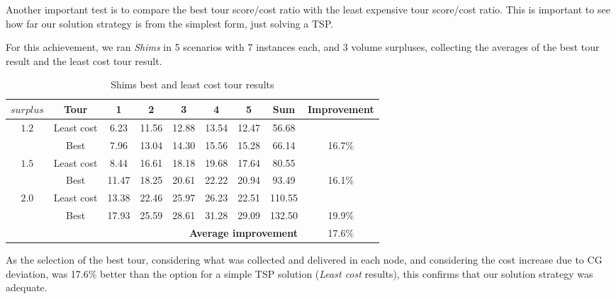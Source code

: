 \documentclass[preprint]{elsarticle}
\begin{document}
{Another important test is to compare the best tour score/cost ratio with the least expensive tour score/cost ratio. This is important to see how far our solution strategy is from the simplest form, just solving a TSP.

For this achievement, we ran {\it Shims} in 5 scenarios with 7 instances each, and 3 volume surpluses, collecting the averages of the best tour result and the least cost tour result.

\begin{table}[H]
\centering
\caption{Shims best and least cost tour results}  \label{tab:20least}
\footnotesize
\begin{tabular}{c|c|ccccc|cc}
\toprule
{$surplus$}              & {\bf Tour} & {\bf 1} & {\bf 2} & {\bf 3} & {\bf 4}  & {\bf 5}   & {\bf Sum} & {\bf Improvement}\\

\midrule[.1pt]	
\multirow{2}{*}{$1.2$}   & Least cost    & 6.23  & 11.56   & 12.88   & 13.54    & 12.47  & 56.68 &       \\ 
& Best                                   & 7.96  & 13.04   & 14.30   & 15.56    & 15.28  & 66.14 & 16.7\%  \\ 
\midrule[.1pt]	
\multirow{2}{*}{$1.5$}   & Least cost    & 8.44  & 16.61   & 18.18   & 19.68    & 17.64  & 80.55 &   \\ %
& Best                                   & 11.47 & 18.25   & 20.61   & 22.22    & 20.94  & 93.49 & 16.1\%  \\ 
\midrule[.1pt]	
\multirow{2}{*}{$2.0$}   & Least cost    & 13.38 & 22.46   & 25.97   & 26.23    & 22.51  & 110.55 &   \\ %
& Best                                   & 17.93 & 25.59   & 28.61   & 31.28    & 29.09  & 132.50 & 19.9\%  \\ 		                         

\midrule[.1pt]
 \multicolumn{8}{r}{{\bf Average improvement}} & 17.6\% \\
\bottomrule
\end{tabular}
\normalsize
\end{table}

As the selection of the best tour, considering what was collected and delivered in each node, and considering the cost increase due to CG deviation, was 17.6\% better than the option for a simple TSP solution (\textit{Least cost} results), this confirms that our solution strategy was adequate.

}
\end{document}
